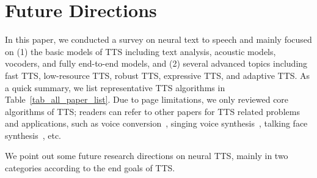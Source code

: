 \documentclass{article}
\begin{document}
\section{Future Directions}
\label{sec_summary}
In this paper, we conducted a survey on neural text to speech and mainly focused on (1) the basic models of TTS including text analysis, acoustic models, vocoders, and fully end-to-end models, and (2) several advanced topics including fast TTS, low-resource TTS, robust TTS, expressive TTS, and adaptive TTS. As a quick summary, we list representative TTS algorithms in Table~\ref{tab_all_paper_list}. Due to page limitations, we only reviewed core algorithms of TTS; readers can refer to other papers for TTS related problems and applications, such as voice conversion~\cite{sisman2020overview}, singing voice synthesis~\cite{hono2019singing,lu2020xiaoicesing,chen2020hifisinger}, talking face synthesis~\cite{chen2020comprises}, etc. 

We point out some future research directions on neural TTS, mainly in two categories according to the end goals of TTS.
\end{document}
